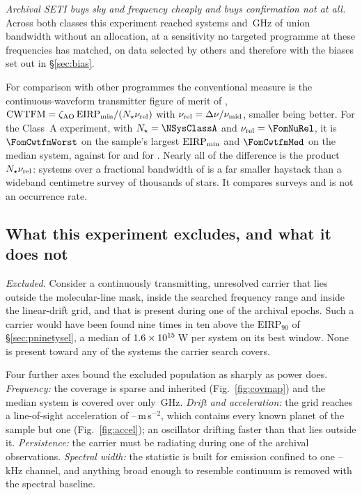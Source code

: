 \emph{Archival SETI buys sky and frequency cheaply and buys confirmation not
at all.} Across both classes this experiment reached \NSystems{} systems and
\UnionGHz\,GHz of union bandwidth without an allocation, at a sensitivity no
targeted programme at these frequencies has matched, on data selected by
others and therefore with the biases set out in \S\ref{sec:bias}.

For comparison with other programmes the conventional measure is the
continuous-waveform transmitter figure of merit of \citet{Enriquez2017},
$\mathrm{CWTFM}=\zeta_{\rm AO}\,\mathrm{EIRP}_{\rm min}/
(N_{\star}\nu_{\rm rel})$ with $\nu_{\rm rel}=\Delta\nu/\nu_{\rm mid}$,
smaller being better. For the Class~A experiment, with
$N_{\star}=\NSysClassA$ and $\nu_{\rm rel}=\FomNuRel$, it is
$\FomCwtfmWorst$ on the sample's largest $\mathrm{EIRP}_{\rm min}$ and
$\FomCwtfmMed$ on the median system, against \FomLitEnriquez{} for
\citet{Enriquez2017} and \FomLitMargot{} for \citet{Margot2023}. Nearly all of
the difference is the product $N_{\star}\nu_{\rm rel}$: \NSysClassA{} systems
over a fractional bandwidth of \FomNuRel{} is a far smaller haystack than a
wideband centimetre survey of thousands of stars. It compares surveys and is
not an occurrence rate.

\subsection{What this experiment excludes, and what it does not}
\label{sec:excludes}

\noindent\emph{Excluded.} Consider a continuously transmitting, unresolved
carrier that lies outside the molecular-line mask, inside the searched
frequency range and inside the linear-drift grid, and that is present during
one of the archival epochs. Such a carrier would have been found nine times
in ten above the $\mathrm{EIRP}_{90}$ of \S\ref{sec:pninetysel}, a median of
$1.6\times10^{15}$\,W per system on its best window. None is present toward
any of the \NSysClassA{} systems the carrier search covers.

Four further axes bound the excluded population as sharply as power does.
\emph{Frequency:} the coverage is sparse and inherited (Fig.~\ref{fig:covmap})
and the median system is covered over only \SysUnionAMed\,GHz. \emph{Drift and
acceleration:} the grid reaches a line-of-sight acceleration of
\AccelCeilMed--\AccelCeilMax\,m\,s$^{-2}$, which contains every known planet
of the sample but one (Fig.~\ref{fig:accel}); an oscillator drifting faster
than that lies outside it. \emph{Persistence:} the carrier must be radiating
during one of the archival observations. \emph{Spectral width:} the statistic
is built for emission confined to one \ChanLoA--\ChanHiA\,kHz channel, and
anything broad enough to resemble continuum is removed with the spectral
baseline.

